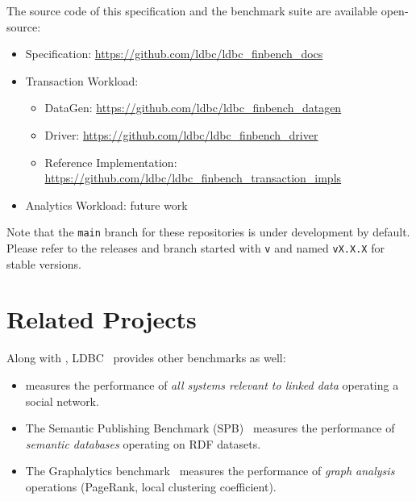 The source code of this specification and the benchmark suite are available
open-source:
\begin{itemize}
    \item \ldbcfinbench Specification: \url{https://github.com/ldbc/ldbc_finbench_docs}
    \item Transaction Workload:
          \begin{itemize}
              \item \ldbcfinbench DataGen: \url{https://github.com/ldbc/ldbc_finbench_datagen}
              \item \ldbcfinbench Driver: \url{https://github.com/ldbc/ldbc_finbench_driver}
              \item \ldbcfinbench Reference Implementation: \url{https://github.com/ldbc/ldbc_finbench_transaction_impls}
          \end{itemize}
    \item Analytics Workload: future work
\end{itemize}

Note that the \texttt{main} branch for these repositories is under development
by default. Please refer to the releases and branch started with \texttt{v} and
named \texttt{vX.X.X} for stable versions.


\section{Related Projects}

Along with \ldbcfinbench, LDBC~\cite{DBLP:journals/sigmod/AnglesBLF0ENMKT14}
provides other benchmarks as well:

\begin{itemize}
    \item \ldbcsnb measures the performance of \emph{all systems relevant to
          linked data} operating a social network.
    \item The Semantic Publishing Benchmark
          (SPB)~\cite{DBLP:conf/semweb/SpasicJP16} measures the performance of
          \emph{semantic databases} operating on RDF datasets.
    \item The Graphalytics
          benchmark~\cite{DBLP:journals/pvldb/IosupHNHPMCCSAT16} measures the
          performance of \emph{graph analysis} operations (\eg PageRank, local
          clustering coefficient).
\end{itemize}